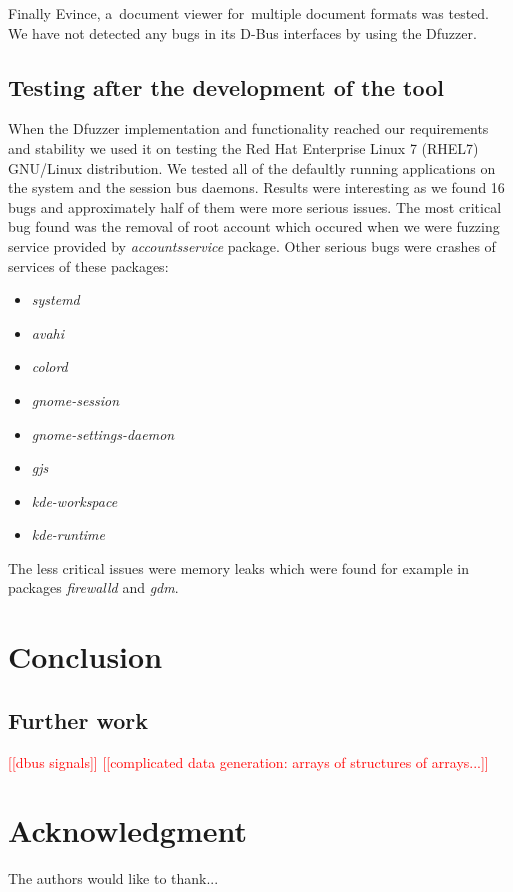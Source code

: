 \documentclass[conference]{IEEEtran}
\newcommand{\addtodo}[1]{\textcolor{red}{[[#1]]}}
\begin{document}
Finally Evince, a~document viewer for~multiple document formats was tested.
We have not detected any bugs in its D-Bus interfaces by using the Dfuzzer.


\subsection{Testing after the development of the tool}
When the Dfuzzer implementation and functionality reached our requirements
and stability we used it on testing the Red Hat Enterprise Linux 7 (RHEL7)
GNU/Linux distribution. We tested all of the defaultly running applications
on the system and the session bus daemons. Results were interesting as we found
16 bugs and approximately half of them were more serious issues. The most
critical bug found was the removal of root account which occured when we were
fuzzing service provided by \emph{accountsservice} package. Other serious bugs
were crashes of services of these packages:
\begin{itemize}
	\item \emph{systemd}
	\item \emph{avahi}
	\item \emph{colord}
	\item \emph{gnome-session}
	\item \emph{gnome-settings-daemon}
	\item \emph{gjs}
	\item \emph{kde-workspace}
	\item \emph{kde-runtime}
\end{itemize}
The less critical issues were memory leaks which were found for example in packages
\emph{firewalld} and \emph{gdm}.


\section{Conclusion}
\subsection{Further work}
\addtodo{dbus signals}
\addtodo{complicated data generation: arrays of structures of arrays...}

\section*{Acknowledgment}

The authors would like to thank...


\end{document}
